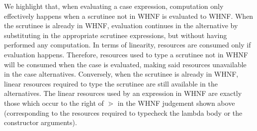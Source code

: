 \documentclass[acmsmall,review]{acmart}
\begin{document}
We highlight that, when evaluating a case expression, computation only
effectively happens when a scrutinee not in WHNF is evaluated to WHNF. When the
scrutinee is already in WHNF, evaluation continues in the alternative by
substituting in the appropriate scrutinee expressions, but without having
performed any computation.
%
In terms of linearity, resources are consumed only if evaluation happens.
Therefore, resources used to type a scrutinee not in
WHNF will be consumed when the case is evaluated, making said resources unavailable in the case
alternatives. Conversely, when the scrutinee is already in WHNF, linear
resources required to type the scrutinee are still available in the alternatives.
The linear resources used by an expression in WHNF are exactly those which
occur to the right of $\gtrdot$ in the WHNF judgement shown above
(corresponding to the resources required to typecheck the lambda body or the
constructor arguments).

%
%
%
%
%


\end{document}
